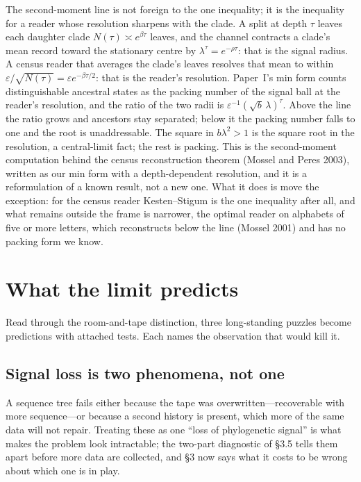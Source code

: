 \documentclass[11pt]{article}
\begin{document}
The second-moment line is not foreign to the one inequality; it is the inequality for a reader whose resolution sharpens with the clade. A split at depth $\tau$ leaves each daughter clade $N(\tau)\asymp e^{\beta\tau}$ leaves, and the channel contracts a clade's mean record toward the stationary centre by $\lambda^\tau=e^{-\rho\tau}$: that is the signal radius. A census reader that averages the clade's leaves resolves that mean to within $\varepsilon/\sqrt{N(\tau)}=\varepsilon e^{-\beta\tau/2}$: that is the reader's resolution. Paper~I's min form counts distinguishable ancestral states as the packing number of the signal ball at the reader's resolution, and the ratio of the two radii is $\varepsilon^{-1}(\sqrt b\,\lambda)^{\tau}$. Above the line the ratio grows and ancestors stay separated; below it the packing number falls to one and the root is unaddressable. The square in $b\lambda^2>1$ is the square root in the resolution, a central-limit fact; the rest is packing. This is the second-moment computation behind the census reconstruction theorem (Mossel and Peres 2003), written as our min form with a depth-dependent resolution, and it is a reformulation of a known result, not a new one. What it does is move the exception: for the census reader Kesten--Stigum is the one inequality after all, and what remains outside the frame is narrower, the optimal reader on alphabets of five or more letters, which reconstructs below the line (Mossel 2001) and has no packing form we know.

\section{What the limit predicts}

Read through the room-and-tape distinction, three long-standing puzzles become predictions with attached tests. Each names the observation that would kill it.

\subsection{Signal loss is two phenomena, not one}
A sequence tree fails either because the tape was overwritten---recoverable with more sequence---or because a second history is present, which more of the same data will not repair. Treating these as one ``loss of phylogenetic signal'' is what makes the problem look intractable; the two-part diagnostic of \S3.5 tells them apart before more data are collected, and \S3 now says what it costs to be wrong about which one is in play.
\end{document}
